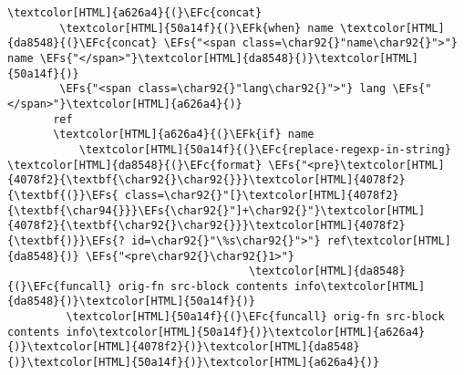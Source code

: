 \documentclass{scrartcl}
\newcommand{\EFk}[1]{\textcolor{EFk}{#1}} %
\newcommand{\EFs}[1]{\textcolor{EFs}{#1}} %
\newcommand{\EFc}[1]{\textcolor{EFc}{#1}} %
\begin{document}
\begin{Code}
\begin{Verbatim}[]
       \textcolor[HTML]{a626a4}{(}\EFc{concat}
        \textcolor[HTML]{50a14f}{(}\EFk{when} name \textcolor[HTML]{da8548}{(}\EFc{concat} \EFs{"<span class=\char92{}"name\char92{}">"} name \EFs{"</span>"}\textcolor[HTML]{da8548}{)}\textcolor[HTML]{50a14f}{)}
        \EFs{"<span class=\char92{}"lang\char92{}">"} lang \EFs{"</span>"}\textcolor[HTML]{a626a4}{)}
       ref
       \textcolor[HTML]{a626a4}{(}\EFk{if} name
           \textcolor[HTML]{50a14f}{(}\EFc{replace-regexp-in-string} \textcolor[HTML]{da8548}{(}\EFc{format} \EFs{"<pre}\textcolor[HTML]{4078f2}{\textbf{\char92{}\char92{}}}\textcolor[HTML]{4078f2}{\textbf{(}}\EFs{ class=\char92{}"[}\textcolor[HTML]{4078f2}{\textbf{\char94{}}}\EFs{\char92{}"]+\char92{}"}\textcolor[HTML]{4078f2}{\textbf{\char92{}\char92{}}}\textcolor[HTML]{4078f2}{\textbf{)}}\EFs{? id=\char92{}"\%s\char92{}">"} ref\textcolor[HTML]{da8548}{)} \EFs{"<pre\char92{}\char92{}1>"}
                                     \textcolor[HTML]{da8548}{(}\EFc{funcall} orig-fn src-block contents info\textcolor[HTML]{da8548}{)}\textcolor[HTML]{50a14f}{)}
         \textcolor[HTML]{50a14f}{(}\EFc{funcall} orig-fn src-block contents info\textcolor[HTML]{50a14f}{)}\textcolor[HTML]{a626a4}{)}\textcolor[HTML]{4078f2}{)}\textcolor[HTML]{da8548}{)}\textcolor[HTML]{50a14f}{)}\textcolor[HTML]{a626a4}{)}


\end{Verbatim}
\end{Code}
\end{document}
